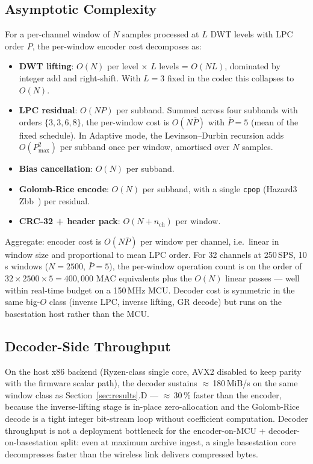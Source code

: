 \documentclass[journal]{IEEEtran}
\begin{document}
\subsection{Asymptotic Complexity}
\label{sec:complexity}
For a per-channel window of $N$ samples processed at $L$ DWT
levels with LPC order $P$, the per-window encoder cost decomposes
as:
\begin{itemize}
\item \textbf{DWT lifting}: $O(N)$ per level $\times$ $L$ levels =
  $O(NL)$, dominated by integer add and right-shift. With $L=3$
  fixed in the codec this collapses to $O(N)$.
\item \textbf{LPC residual}: $O(NP)$ per subband. Summed across
  four subbands with orders $\{3,3,6,8\}$, the per-window cost is
  $O(N \bar{P})$ with $\bar{P} = 5$ (mean of the fixed schedule).
  In Adaptive mode, the Levinson--Durbin recursion adds
  $O(P_{\max}^{2})$ per subband once per window, amortised over
  $N$ samples.
\item \textbf{Bias cancellation}: $O(N)$ per subband.
\item \textbf{Golomb-Rice encode}: $O(N)$ per subband, with a
  single \texttt{cpop} (Hazard3 Zbb~\cite{rp2350_datasheet}) per residual.
\item \textbf{CRC-32 + header pack}: $O(N + n_{\text{ch}})$ per
  window.
\end{itemize}
Aggregate: encoder cost is $O(N \bar{P})$ per window per channel,
i.e.\ linear in window size and proportional to mean LPC order.
For 32 channels at 250\,SPS, 10\,s windows ($N = 2500$,
$\bar{P} = 5$), the per-window operation count is on the order of
$32 \times 2500 \times 5 = 400{,}000$ MAC equivalents plus the
$O(N)$ linear passes --- well within real-time budget on a
150\,MHz MCU. Decoder cost is symmetric in the same big-$O$
class (inverse LPC, inverse lifting, GR decode) but runs on the
basestation host rather than the MCU.

\subsection{Decoder-Side Throughput}
\label{sec:decoder-throughput}
On the host x86 backend (Ryzen-class single core, AVX2 disabled to
keep parity with the firmware scalar path), the decoder sustains
$\approx$\,180\,MiB/s on the same window class as
Section~\ref{sec:results}.D --- $\approx$\,30\,\% faster than the
encoder, because the inverse-lifting stage is in-place
zero-allocation and the Golomb-Rice decode is a tight integer
bit-stream loop without coefficient computation. Decoder
throughput is not a deployment bottleneck for the
encoder-on-MCU + decoder-on-basestation split: even at maximum
archive ingest, a single basestation core decompresses faster
than the wireless link delivers compressed bytes.
\end{document}
